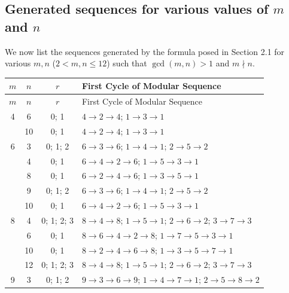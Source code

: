 \documentclass[12pt,a4paper]{article}
\renewcommand{\arraystretch}{1.3}
\theoremstyle{remark} %
\theoremstyle{example} %
\theoremstyle{proposition}
\begin{document}
\subsection{ Generated sequences for various values of $m$ and $n$ }
We now list the sequences generated by the formula posed in Section 2.1 for various $m, n$ ($2 < m, n \leq 12$) such that $\gcd(m,n) > 1$ and $m \nmid n$.
\renewcommand{\arraystretch}{1.3}
\setlength{\tabcolsep}{12pt}
\begin{longtable}{|c|c|c|l|}
\hline
$m$ & $n$ & $r$ & First Cycle of Modular Sequence \\
\hline
\endfirsthead
\hline
$m$ & $n$ & $r$ & First Cycle of Modular Sequence \\
\hline
\endhead
4 & 6 & 0; 1 & $4 \rightarrow 2 \rightarrow 4$; $1 \rightarrow 3 \rightarrow 1$ \\
 & 10 & 0; 1 & $4 \rightarrow 2 \rightarrow 4$; $1 \rightarrow 3 \rightarrow 1$\\
\midrule
6 & 3 & 0; 1; 2 & $6 \rightarrow 3 \rightarrow 6$; $1 \rightarrow 4 \rightarrow 1$; $2 \rightarrow 5 \rightarrow 2$  \\
 & 4 & 0; 1 & $6 \rightarrow 4 \rightarrow 2 \rightarrow 6$; $1 \rightarrow 5 \rightarrow 3 \rightarrow 1$\\
 & 8 & 0; 1 & $6 \rightarrow 2 \rightarrow 4 \rightarrow 6$; $1 \rightarrow 3 \rightarrow 5 \rightarrow 1$\\
 & 9 & 0; 1; 2 & $6 \rightarrow 3 \rightarrow 6$; $1 \rightarrow 4 \rightarrow 1$; $2 \rightarrow 5 \rightarrow 2$\\
 & 10 & 0; 1 & $6 \rightarrow 4 \rightarrow 2 \rightarrow 6$; $1 \rightarrow 5 \rightarrow 3 \rightarrow 1$\\
\midrule
8 & 4 & 0; 1; 2; 3 & $8 \rightarrow 4 \rightarrow 8$; $1 \rightarrow 5 \rightarrow 1$; $2\rightarrow 6 \rightarrow 2$; $3 \rightarrow 7 \rightarrow 3$ \\
 & 6 & 0; 1 & $8 \rightarrow 6 \rightarrow 4 \rightarrow 2 \rightarrow 8$; $1 \rightarrow 7 \rightarrow 5 \rightarrow 3 \rightarrow 1$\\
& 10 & 0; 1 & $8 \rightarrow 2 \rightarrow 4 \rightarrow 6 \rightarrow 8$; $1 \rightarrow 3 \rightarrow 5 \rightarrow 7 \rightarrow 1$ \\
& 12 & 0; 1; 2; 3 & $8 \rightarrow 4 \rightarrow 8$; $1 \rightarrow 5 \rightarrow 1$; $2 \rightarrow 6 \rightarrow 2$; $3 \rightarrow 7 \rightarrow 3$ \\
\midrule
9 & 3 & 0; 1; 2 & $9 \rightarrow 3 \rightarrow 6 \rightarrow 9$; $1 \rightarrow 4 \rightarrow 7 \rightarrow 1$; $2 \rightarrow 5 \rightarrow 8 \rightarrow 2$ \\

\end{longtable}
\end{document}

